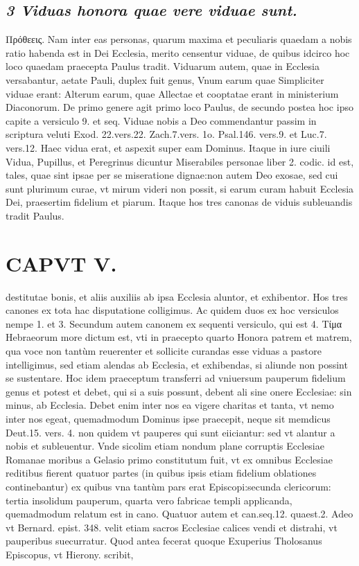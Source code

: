 \documentclass{article}
\begin{document}
\begin{pages}
\subsection*{\textit{3 Viduas honora quae vere viduae sunt. }}\pstart Πρόθεεις. Nam inter eas personas, quarum maxima et peculiaris quaedam a nobis ratio habenda est in Dei Ecclesia, merito censentur viduae, de quibus idcirco hoc loco quaedam praecepta Paulus tradit. Viduarum autem, quae in Ecclesia versabantur, aetate Pauli, duplex fuit genus, Vnum earum quae Simpliciter viduae erant: Alterum earum, quae Allectae et cooptatae erant in ministerium Diaconorum. De primo genere agit primo loco Paulus, de secundo postea hoc ipso capite a versiculo 9. et seq.  \pend\pstart Viduae nobis a Deo commendantur passim in scriptura veluti Exod. 22.vers.22. Zach.7.vers. 1o. Psal.146. vers.9. et Luc.7. vers.12. Haec vidua erat, et aspexit super eam Dominus. Itaque in iure ciuili Vidua, Pupillus, et Peregrinus dicuntur Miserabiles personae liber  2. codic. id est, tales, quae sint ipsae per se miseratione dignae:non autem Deo exosae, sed cui sunt plurimum curae, vt mirum videri non possit, si earum curam habuit Ecclesia Dei, praesertim fidelium et piarum. Itaque hos tres canonas de viduis subleuandis tradit Paulus.  \pend
\section*{CAPVT  V. }
\marginpar{[ p.83 ]}\pstart destitutae bonis, et aliis auxiliis ab ipsa Ecclesia aluntor, et exhibentor.  \pend\pstart Hos tres canones ex tota hac disputatione colligimus. Ac quidem duos ex hoc versiculos nempe 1. et 3. Secundum autem canonem ex sequenti versiculo, qui est 4. Tίμα Hebraeorum more dictum est, vti in praecepto quarto Honora patrem et matrem, qua voce non tantùm reuerenter et sollicite curandas esse viduas a pastore intelligimus, sed etiam alendas ab Ecclesia, et exhibendas, si aliunde non possint se sustentare. Hoc idem praeceptum transferri ad vniuersum pauperum fidelium genus et potest et debet, qui si a suis possunt, debent ali sine onere Ecclesiae: sin minus, ab Ecclesia. Debet enim inter nos ea vigere charitas et tanta, vt nemo inter nos egeat, quemadmodum Dominus ipse praecepit, neque sit memdicus Deut.15. vers. 4. non quidem vt pauperes qui sunt eiiciantur: sed vt alantur a nobis et subleuentur.  \pend\pstart Vnde sicolim etiam nondum plane corruptis Ecclesiae Romanae moribus a Gelasio primo constitutum fuit, vt ex omnibus Ecclesiae reditibus fierent quatuor partes (in quibus ipsis etiam fidelium oblationes continebantur) ex quibus vna tantùm pars erat Episcopi:secunda clericorum: tertia insolidum pauperum, quarta vero fabricae templi applicanda, quemadmodum relatum est in cano. Quatuor autem et can.seq.12. quaest.2. Adeo vt Bernard. epist. 348. velit etiam sacros Ecclesiae calices vendi et distrahi, vt pauperibus suecurratur. Quod antea fecerat quoque Exuperius Tholosanus Episcopus, vt Hierony. scribit,  \pend

\end{pages}
\end{document}
